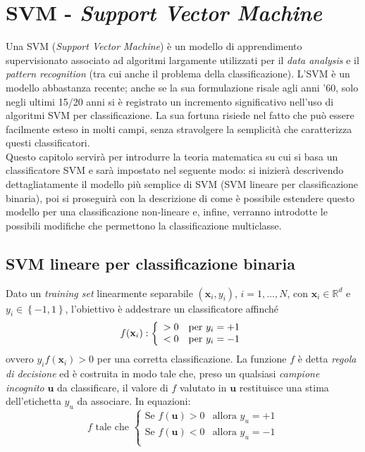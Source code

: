 \chapter{SVM - \emph{Support Vector Machine}} %

\label{cap:svm} %

Una SVM (\emph{Support Vector Machine}) è un modello di apprendimento supervisionato associato ad algoritmi largamente utilizzati per il \emph{data analysis} e il \emph{pattern recognition} (tra cui anche il problema della classificazione).
L'SVM è un modello abbastanza recente; anche se la sua formulazione risale agli anni '60, solo negli ultimi 15/20 anni si è registrato un incremento significativo nell'uso di algoritmi SVM per classificazione.
La sua fortuna risiede nel fatto che può essere facilmente esteso in molti campi, senza stravolgere la semplicità che caratterizza questi classificatori.
\\
Questo capitolo servirà per introdurre la teoria matematica su cui si basa un classificatore SVM e sarà impostato nel seguente modo: si inizierà descrivendo dettagliatamente il modello più semplice di SVM (SVM lineare per classificazione binaria), poi si proseguirà con la descrizione di come è possibile estendere questo modello per una classificazione non-lineare e, infine, verranno introdotte le possibili modifiche che permettono la classificazione multiclasse.
\clearpage

\section{SVM lineare per classificazione binaria}
Dato un \emph{training set} linearmente separabile $(\mathbf{x}_i,y_i)$, $i=1,\ldots,N$, con $\mathbf{x}_i\in\mathbb{R}^d$ e $y_i\in\left\lbrace -1,1\right\rbrace$, l'obiettivo è addestrare un classificatore affinché
\begin{equation}
\label{eq:SVM_lin_bin}
f(\mathbf{x}_i):\left\{ \begin{array}{ll} >0 & \mbox{per } y_i=+1 \\ < 0 & \mbox{per } y_i=-1 \end{array} \right.
\end{equation}
ovvero $y_if(\mathbf{x}_i)>0$ per una corretta classificazione.
La funzione $f$ è detta \textit{regola di decisione} ed è costruita in modo tale che, preso un qualsiasi \textit{campione incognito} $\mathbf{u}$ da classificare, il valore di $f$ valutato in $\mathbf{u}$ restituisce una stima dell'etichetta $y_u$ da associare. In equazioni:
\begin{equation}
\label{eq:regola_di_decisione}
f\text{ tale che }
\left\{
		\begin{array}{ll}
			\text{Se } f(\mathbf{u})>0 & \mbox{allora } y_u=+1 \\
			\text{Se } f(\mathbf{u})<0 & \mbox{allora } y_u=-1 \\
		\end{array}
	\right.
\end{equation}
